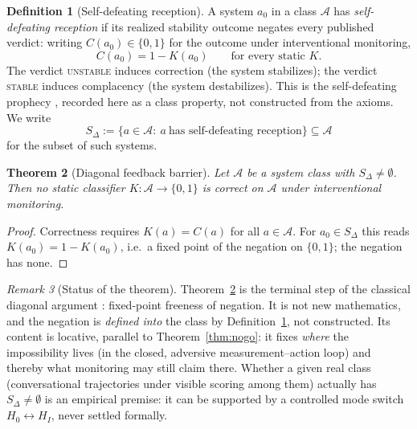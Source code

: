 \documentclass[11pt]{article}
\theoremstyle{plain}
\newtheorem{theorem}{Theorem}[section]
\theoremstyle{definition}
\newtheorem{definition}[theorem]{Definition}
\theoremstyle{remark}
\newtheorem{remark}[theorem]{Remark}
\begin{document}
\begin{definition}[Self-defeating reception]\label{def:sdelta}
A system $a_0$ in a class $\mathcal A$ has \emph{self-defeating reception} if its realized stability outcome negates every published verdict: writing $C(a_0)\in\{0,1\}$ for the outcome under interventional monitoring,
\[
C(a_0)=1-K(a_0)\qquad\text{for every static }K.
\]
The verdict \textsc{unstable} induces correction (the system stabilizes); the verdict \textsc{stable} induces complacency (the system destabilizes). This is the self-defeating prophecy \citep{merton1948}, recorded here as a class property, not constructed from the axioms. We write
\[
S_\Delta:=\{a\in\mathcal A:\ a\ \text{has self-defeating reception}\}\subseteq\mathcal A
\]
for the subset of such systems.
\end{definition}

\begin{theorem}[Diagonal feedback barrier]\label{thm:nogo2}
Let $\mathcal A$ be a system class with $S_\Delta\ne\emptyset$. Then no static classifier $K:\mathcal A\to\{0,1\}$ is correct on $\mathcal A$ under interventional monitoring.
\end{theorem}
\begin{proof}
Correctness requires $K(a)=C(a)$ for all $a\in\mathcal A$. For $a_0\in S_\Delta$ this reads $K(a_0)=1-K(a_0)$, i.e.\ a fixed point of the negation on $\{0,1\}$; the negation has none.
\end{proof}

\begin{remark}[Status of the theorem]\label{rem:status2}
Theorem~\ref{thm:nogo2} is the terminal step of the classical diagonal argument \citep{lawvere1969,yanofsky2003}: fixed-point freeness of negation. It is not new mathematics, and the negation is \emph{defined into} the class by Definition~\ref{def:sdelta}, not constructed. Its content is locative, parallel to Theorem~\ref{thm:nogo}: it fixes \emph{where} the impossibility lives (in the closed, adversive measurement--action loop) and thereby what monitoring may still claim there. Whether a given real class (conversational trajectories under visible scoring among them) actually has $S_\Delta\ne\emptyset$ is an empirical premise: it can be supported by a controlled mode switch $H_0\leftrightarrow H_I$, never settled formally.
\end{remark}
\end{document}
